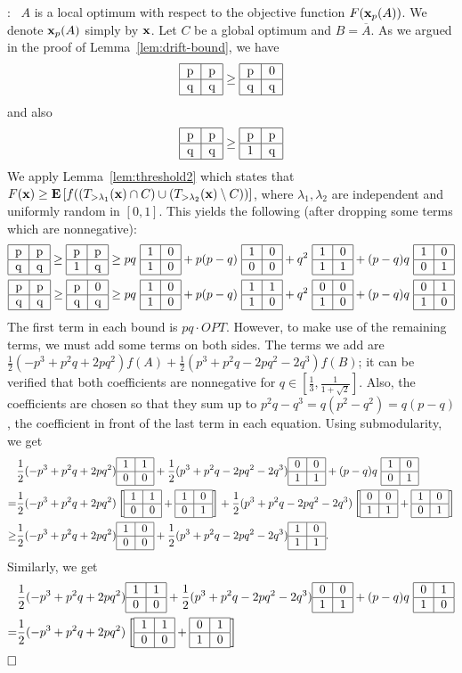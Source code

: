 \documentclass{article}[11pt]
\newcommand{\E}[1]{{\bf{E}}\left[#1\right]}
\renewenvironment{proof}{\noindent{\bf Proof}:~}{$\hfill \Box$\\}
\newcommand{\T}[4] {\begin{tabular}{|c|c|}
\hline
#1 & #2 \\
\hline
#3 & #4 \\
\hline
\end{tabular}}
\def\bx{{\bf x}}
\begin{document}
\begin{proof}
$A$ is a local optimum with respect to the objective function $F(\bx_p(A))$.
We denote $\bx_p(A)$ simply by $\bx$. Let $C$ be a global optimum and $B = \overline{A}$.
As we argued in the proof of Lemma~\ref{lem:drift-bound}, we have
$$ \T{p}{p}{q}{q} \geq \T{p}{0}{q}{q} $$
and also
$$ \T{p}{p}{q}{q} \geq \T{p}{p}{1}{q} $$
We apply Lemma~\ref{lem:threshold2} which states that
$F(\bx) \geq \E{f((T_{>\lambda_1}(\bx) \cap C) \cup (T_{>\lambda_2}(\bx) \setminus C))}$,
where $\lambda_1, \lambda_2$ are independent and uniformly random in $[0,1]$.
This yields the following (after dropping some terms which are nonnegative):
\begin{eqnarray}
\label{eq:unconst_intial_localopt1}
 \T{p}{p}{q}{q} \geq \T{p}{p}{1}{q} \geq
  pq~\T{1}{0}{1}{0} + p(p-q)~\T{1}{0}{0}{0} + q^2~\T{1}{0}{1}{1} + (p-q)q~\T{1}{0}{0}{1} \\
  \label{eq:unconst_intial_localopt2}
 \T{p}{p}{q}{q} \geq \T{p}{0}{q}{q}
\geq pq~\T{1}{0}{1}{0} + p(p-q)~\T{1}{1}{1}{0} + q^2~\T{0}{0}{1}{0} + (p-q)q~\T{0}{1}{1}{0} 
\end{eqnarray}
The first term in each bound is $pq \cdot OPT$.
However, to make use of the remaining terms, we must add some terms on both sides.
The terms we add are $\frac12 (-p^3 + p^2 q + 2pq^2) f(A) + \frac12 (p^3 + p^2 q -2pq^2 -2q^3) f(B)$;
it can be verified that both coefficients are nonnegative for $q \in [\frac13, \frac{1}{1+\sqrt{2}}]$.
Also, the coefficients are chosen so that they sum up to $p^2 q - q^3 = q (p^2 - q^2) = q (p-q)$,
the coefficient in front of the last term in each equation. Using submodularity, we get
\begin{eqnarray}
 & \frac12 (-p^3 + p^2 q + 2pq^2) \T{1}{1}{0}{0} + \frac12 (p^3 + p^2 q -2pq^2 -2q^3) \T{0}{0}{1}{1} + (p-q)q~\T{1}{0}{0}{1} \nonumber \\
 = & \frac12 (-p^3 + p^2 q + 2pq^2) \left[ \T{1}{1}{0}{0} + \T{1}{0}{0}{1} \right]  + 
 \frac12 (p^3 + p^2 q -2pq^2 -2q^3) \left[ \T{0}{0}{1}{1} + \T{1}{0}{0}{1} \right] \nonumber \\
\label{eq:unconst_intial_localopt3}
 \geq & \frac12 (-p^3 + p^2 q + 2pq^2) \T{1}{0}{0}{0} + 
 \frac12 (p^3 + p^2 q -2pq^2 -2q^3) \T{1}{0}{1}{1}.
\end{eqnarray}
Similarly, we get
\begin{eqnarray}
 & \frac12 (-p^3 + p^2 q + 2pq^2) \T{1}{1}{0}{0} + \frac12 (p^3 + p^2 q -2pq^2 -2q^3) \T{0}{0}{1}{1} + (p-q)q~\T{0}{1}{1}{0} \nonumber \\
 = & \frac12 (-p^3 + p^2 q + 2pq^2) \left[ \T{1}{1}{0}{0} + \T{0}{1}{1}{0} \right]

\end{eqnarray}
\end{proof}
\end{document}

